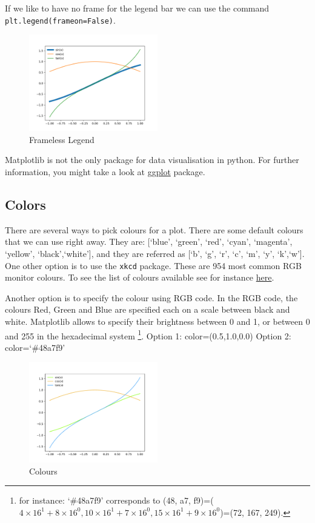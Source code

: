 \documentclass[10pt,a4paper]{article}
\newcommand{\te}{\texttt}
\begin{document}
If we like to have no frame for the legend bar we can use the command \te{plt.legend(frameon=False)}.

\begin{figure}[h]\centering
\caption{Frameless Legend}
\includegraphics[width=0.5\textwidth]{legendframeless.png}
\end{figure}

Matplotlib is not the only package for data visualisation in python. For further information, you might take a look at \href{http://ggplot.yhathq.com/how-it-works.html}{ggplot} package.


\subsection{Colors}
There are several ways to pick colours for a plot. There are some default colours that we can use right away. They are: [`blue', `green', `red', `cyan', `magenta', `yellow', `black',`white'], and they are referred as  [`b', `g', `r', `c', `m', `y', `k',`w']. One other option is to use the \te{xkcd} package. These are 954 most common RGB monitor colours. To see the list of colours available see for instance \href{https://xkcd.com/color/rgb/}{here}. 

Another option is to specify the colour using RGB code. In the RGB code, the colours Red, Green and Blue are specified each on a scale between black and white. Matplotlib allows to specify their brightness between 0 and 1, or between 0 and 255 in the hexadecimal system \footnote{for instance: `\#48a7f9' corresponds to (48, a7, f9)=($4\times 16^1+8\times 16^0, 10\times 16^1+7\times 16^0, 15\times 16^1+9\times 16^0$)=(72, 167, 249). }.
Option 1: color=(0.5,1.0,0.0)
Option 2: color=`\#48a7f9'

\begin{figure}[h]\centering
\caption{Colours}
\includegraphics[width=0.5\textwidth]{all_colour.pdf}
\end{figure}
\end{document}
